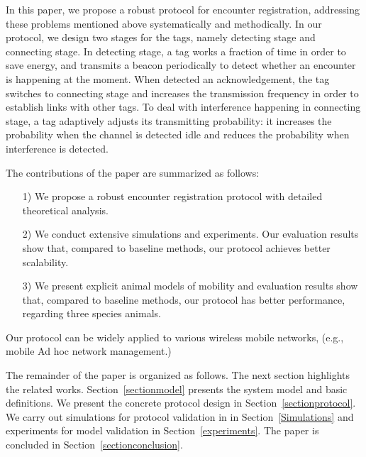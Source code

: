

In this paper, we propose a robust protocol for encounter registration, 
addressing these problems mentioned above systematically and
methodically. In our protocol, we design two stages for the tags, 
namely detecting stage and connecting stage.
In detecting stage, a tag works a fraction of time in order to save energy,
and transmits a beacon periodically to detect whether an encounter is happening at the moment.
When detected an acknowledgement, the tag switches to connecting stage and increases the 
transmission frequency in order to establish links with other tags. To deal with interference 
happening in connecting stage,
a tag adaptively adjusts its transmitting probability: it increases the probability when 
the channel is detected idle and reduces the probability when interference is detected.  


The contributions of the paper are summarized as follows:
\begin{itemize}
\item[1)] We propose a robust encounter registration protocol  
with detailed theoretical analysis. 
\item[2)] We conduct extensive simulations and experiments. Our evaluation results show that, 
compared to baseline methods, our protocol achieves better scalability.
\item[3)] We present explicit animal models of mobility and evaluation results show that,
compared to baseline methods, our protocol has better performance, regarding three species animals. 
\end{itemize}

Our protocol can be widely applied to various wireless mobile networks, (e.g., mobile Ad hoc network management.)


The remainder of the paper is organized as follows. 
The next section highlights the related works.
Section~\ref{sectionmodel} presents the system model and basic definitions.
We present the concrete protocol design
in Section~\ref{sectionprotocol}. 
We carry out simulations for protocol validation in in Section~\ref{Simulations}
and experiments for model validation in Section~\ref{experiments}.
The paper is concluded in Section~\ref{sectionconclusion}.
